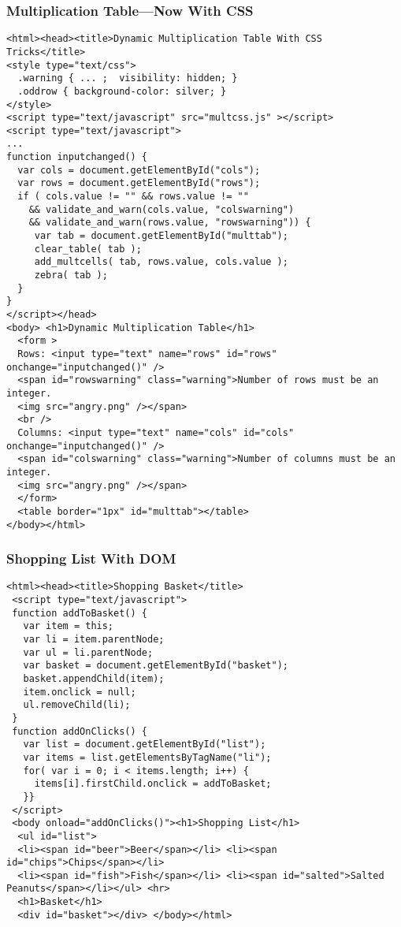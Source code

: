 \documentclass[svgnames,handout]{beamer}
\begin{document}
\begin{frame}[fragile=singleslide] 
\frametitle{Multiplication Table---Now With CSS}
\begin{tiny}
\begin{verbatim}
<html><head><title>Dynamic Multiplication Table With CSS Tricks</title>
<style type="text/css">
  .warning { ... ;  visibility: hidden; }
  .oddrow { background-color: silver; }
</style>
<script type="text/javascript" src="multcss.js" ></script>
<script type="text/javascript">
...
function inputchanged() {
  var cols = document.getElementById("cols");
  var rows = document.getElementById("rows");
  if ( cols.value != "" && rows.value != "" 
    && validate_and_warn(cols.value, "colswarning") 
    && validate_and_warn(rows.value, "rowswarning")) {   
     var tab = document.getElementById("multtab");
     clear_table( tab );
     add_multcells( tab, rows.value, cols.value );
     zebra( tab );
  }
}
</script></head>
<body> <h1>Dynamic Multiplication Table</h1>
  <form >
  Rows: <input type="text" name="rows" id="rows" onchange="inputchanged()" /> 
  <span id="rowswarning" class="warning">Number of rows must be an integer. 
  <img src="angry.png" /></span>
  <br />
  Columns: <input type="text" name="cols" id="cols" onchange="inputchanged()" />
  <span id="colswarning" class="warning">Number of columns must be an integer.
  <img src="angry.png" /></span>
  </form> 
  <table border="1px" id="multtab"></table>
</body></html>
\end{verbatim}
\end{tiny}
\end{frame}



\begin{frame}[fragile=singleslide] 
\frametitle{Shopping List With DOM}

\begin{scriptsize}
\begin{verbatim}
<html><head><title>Shopping Basket</title>
 <script type="text/javascript">
 function addToBasket() {
   var item = this;
   var li = item.parentNode;
   var ul = li.parentNode;
   var basket = document.getElementById("basket");
   basket.appendChild(item);
   item.onclick = null;
   ul.removeChild(li);
 }
 function addOnClicks() {
   var list = document.getElementById("list");
   var items = list.getElementsByTagName("li");
   for( var i = 0; i < items.length; i++) {
     items[i].firstChild.onclick = addToBasket;
   }}       
 </script>
 <body onload="addOnClicks()"><h1>Shopping List</h1>
  <ul id="list">
  <li><span id="beer">Beer</span></li> <li><span id="chips">Chips</span></li>
  <li><span id="fish">Fish</span></li> <li><span id="salted">Salted Peanuts</span></li></ul> <hr>
  <h1>Basket</h1>
  <div id="basket"></div> </body></html>
\end{verbatim}
\end{scriptsize}  
\end{frame}
\end{document}
